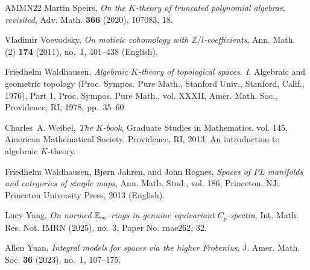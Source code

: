 \documentclass[english,10pt]{amsart}
\theoremstyle{definition}
\numberwithin{equation}{section}
\begin{document}
{\begin{thebibliography}{AMMN22}
Martin Speirs, \emph{On the {$K$}-theory of truncated polynomial algebras, revisited}, Adv. Math. \textbf{366} (2020), 107083, 18. 

Vladimir Voevodsky, \emph{On motivic cohomology with {{\(\mathbb{Z}/l\)}}-coefficients}, Ann. Math. (2) \textbf{174} (2011), no.~1, 401--438 (English).

Friedhelm Waldhausen, \emph{Algebraic {$K$}-theory of topological spaces. {I}}, Algebraic and geometric topology ({P}roc. {S}ympos. {P}ure {M}ath., {S}tanford {U}niv., {S}tanford, {C}alif., 1976), {P}art 1, Proc. Sympos. Pure Math., vol. XXXII, Amer. Math. Soc., Providence, RI, 1978, pp.~35--60. 

Charles~A. Weibel, \emph{The {$K$}-book}, Graduate Studies in Mathematics, vol. 145, American Mathematical Society, Providence, RI, 2013, An introduction to algebraic $K$-theory. 

Friedhelm Waldhausen, Bj{\o}rn Jahren, and John Rognes, \emph{Spaces of {PL} manifolds and categories of simple maps}, Ann. Math. Stud., vol. 186, Princeton, NJ: Princeton University Press, 2013 (English).

Lucy Yang, \emph{On normed {$\Bbb E_\infty$}-rings in genuine equivariant {$C_p$}-spectra}, Int. Math. Res. Not. IMRN (2025), no.~3, Paper No. rnae262, 32. 

Allen Yuan, \emph{Integral models for spaces via the higher {F}robenius}, J. Amer. Math. Soc. \textbf{36} (2023), no.~1, 107--175. 

\end{thebibliography}
}
\end{document}
